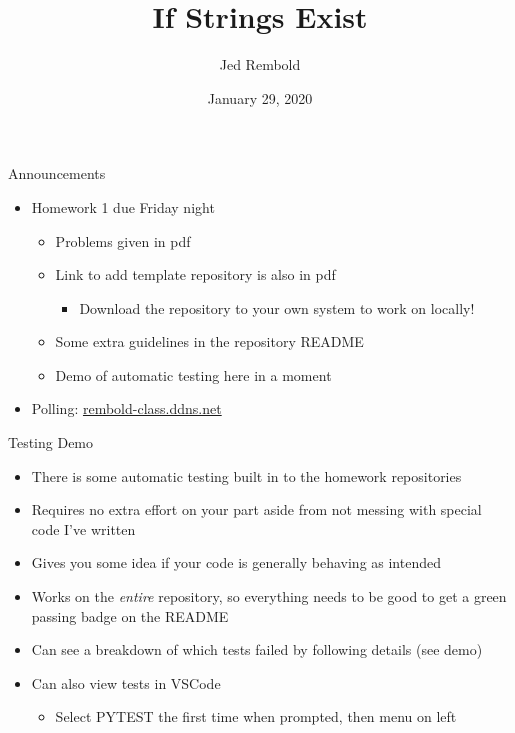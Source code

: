 \documentclass[pdf, aspectratio=169, 12pt]{beamer}
\title{If Strings Exist}
\author{Jed Rembold}
\date{January 29, 2020}
\begin{document}
\begin{frame}{Announcements}
	\begin{itemize}
		\item Homework 1 due Friday night
			\begin{itemize}
				\item Problems given in pdf
				\item Link to add template repository is also in pdf
					\begin{itemize}
						\item \alert{Download} the repository to your own system to work on locally!
					\end{itemize}
				\item Some extra guidelines in the repository README
				\item Demo of automatic testing here in a moment
			\end{itemize}
		\item Polling: \url{rembold-class.ddns.net}
	\end{itemize}
\end{frame}

\begin{frame}{Testing Demo}
	\begin{itemize}
		\item There is some automatic testing built in to the homework repositories
		\item Requires no extra effort on your part aside from not messing with special code I've written
		\item Gives you some idea if your code is generally behaving as intended
		\item Works on the \emph{entire} repository, so everything needs to be good to get a green passing badge on the README
		\item Can see a breakdown of which tests failed by following details (see demo)
		\item Can also view tests in VSCode
			\begin{itemize}
				\item Select PYTEST the first time when prompted, then menu on left
			\end{itemize}
	\end{itemize}
\end{frame}
\end{document}
